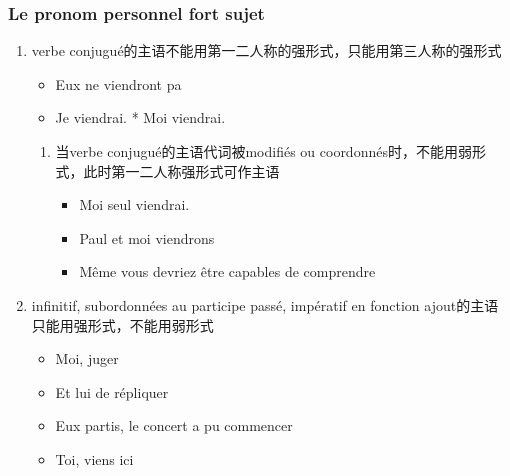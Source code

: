 \documentclass[UTF8]{report}
\begin{document}
\subsubsection{Le pronom personnel fort sujet}
\begin{enumerate}
    \item verbe conjugué的主语不能用第一二人称的强形式，只能用第三人称的强形式
    \begin{itemize}
        \item Eux ne viendront pa
        \item Je viendrai. * Moi viendrai.
    \end{itemize}
    \begin{enumerate}
        \item 当verbe conjugué的主语代词被modifiés ou coordonnés时，不能用弱形式，此时第一二人称强形式可作主语
        \begin{itemize}
            \item Moi seul viendrai.
            \item Paul et moi viendrons
            \item Même vous devriez être capables de comprendre
        \end{itemize}
    \end{enumerate}
    \item infinitif, subordonnées au participe passé, impératif en fonction ajout的主语只能用强形式，不能用弱形式
    \begin{itemize}
        \item Moi, juger
        \item Et lui de répliquer
        \item Eux partis, le concert a pu commencer
        \item Toi, viens ici
    \end{itemize}
\end{enumerate}
\end{document}

